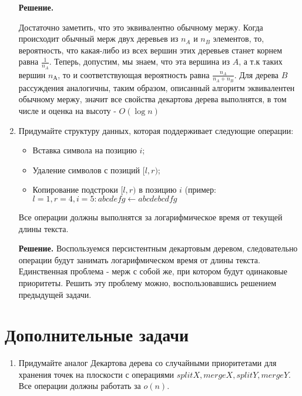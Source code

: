 \begin{enumerate}
	\textbf{Решение.}
	
	Достаточно заметить, что это эквивалентно обычному мержу. Когда происходит обычный мерж двух деревьев из $n_A$ и $n_B$ элементов, то, вероятность, что какая-либо из всех вершин этих деревьев станет корнем равна $\frac{1}{n_A}$. Теперь, допустим, мы знаем, что эта вершина из $A$, а т.к таких вершин $n_А$, то и соответствующая вероятность равна $\frac{n_A}{n_A + n_B}$. Для дерева $B$ рассуждения аналогичны, таким образом, описанный алгоритм эквивалентен обычному мержу, значит все свойства декартова дерева выполнятся, в том числе и оценка на высоту - $O(\log n)$
	
	\item Придумайте структуру данных, которая поддерживает следующие операции:
	
	\begin{itemize}
		\item Вставка символа на позицию $i$;
		\item Удаление символов с позиций $[l, r)$;
		\item Копирование подстроки $[l, r)$ в позицию $i$ (пример: $l = 1, r = 4, i = 5 : abcdefg \leftarrow abcdebcdfg$
	\end{itemize}
	
	Все операции должны выполнятся за логарифмическое время от текущей длины текста.
	
	\textbf{Решение.}
	Воспользуемся персистентным декартовым деревом, следовательно операции будут занимать логарифмическом время от длины текста. Единственная проблема - мерж с собой же, при котором будут одинаковые приоритеты. Решить эту проблему можно, воспользовавшись решением предыдущей задачи.
	
\end{enumerate}

\section*{Дополнительные задачи}
\begin{enumerate}
	\item Придумайте аналог Декартова дерева со случайными приоритетами для хранения точек на плоскости с операциями $splitX, mergeX, splitY, mergeY$. Все операции должны работать за $o(n)$.
\end{enumerate}

